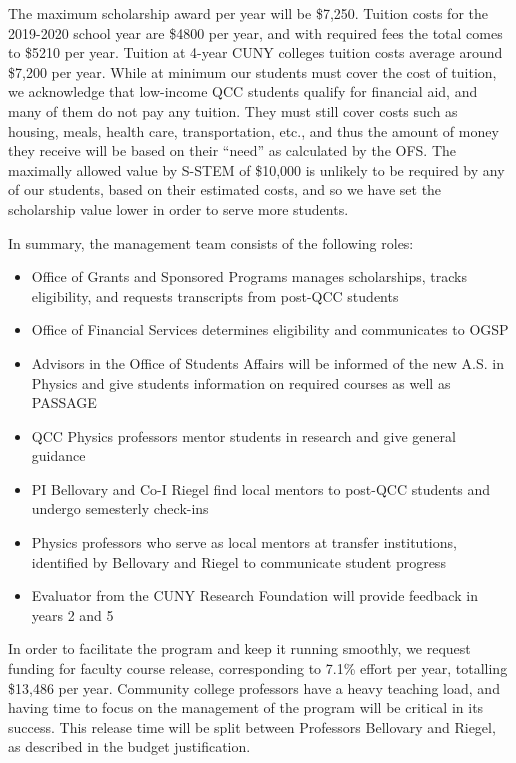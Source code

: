\documentclass[12pt]{article}
\begin{document}
The maximum scholarship award per year will be \$7,250.  Tuition costs for the 2019-2020 school year are \$4800 per year, and with required fees the total comes to \$5210 per year.  Tuition at 4-year CUNY colleges tuition costs average around \$7,200 per year.  While at minimum our students must cover the cost of tuition, we acknowledge that low-income QCC students qualify for financial aid, and many of them do not pay any tuition.  They must still cover costs such as housing, meals, health care, transportation, etc., and thus the amount of money they receive will be based on their ``need'' as calculated by the OFS.   The maximally allowed value by S-STEM of \$10,000 is unlikely to be required by any of our students, based on their estimated costs, and so we have set the scholarship value lower in order to serve more students.

In summary, the management team consists of the following roles:
\begin{itemize}
\setlength{\itemsep}{-\parsep}
\setlength{\topsep}{-\parsep}
\setlength{\partopsep}{-\parsep}
	\item Office of Grants and Sponsored Programs manages scholarships, tracks eligibility, and requests transcripts from post-QCC students
	\item Office of Financial Services determines eligibility and communicates to OGSP
		\item Advisors in the Office of Students Affairs will be informed of the new A.S. in Physics and give students information on required courses as well as PASSAGE
	\item QCC Physics professors mentor students in research and give general guidance
	\item PI Bellovary and Co-I Riegel find local mentors to post-QCC students and undergo semesterly check-ins
	\item Physics professors who serve as local mentors at transfer institutions, identified by Bellovary and Riegel to communicate student progress

	\item Evaluator from the CUNY Research Foundation will provide feedback in years 2 and 5
\end{itemize}	


In order to facilitate the program and keep it running smoothly, we request funding for faculty course release, corresponding to 7.1\% effort per year, totalling \$13,486 per year.  Community college professors have a heavy teaching load, and having time to focus on the management of the program will be critical in its success.  This release time will be split between Professors Bellovary and Riegel, as described in the budget justification.
\end{document}
